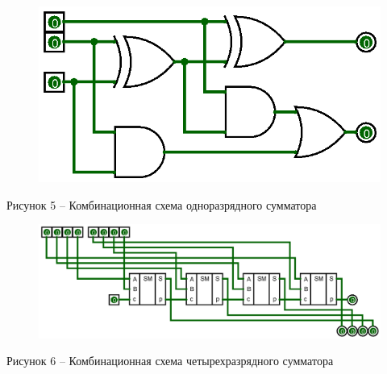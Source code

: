 \documentclass[a4paper,14pt]{extarticle}
\begin{document}
	\begin{figure}[h]
		\centering
		\includegraphics[width=0.5\linewidth]{images/s-2-1}
	\end{figure}
	\begin{center}
		Рисунок 5 – Комбинационная схема одноразрядного сумматора
	\end{center}
	
	\begin{figure}[h]
		\centering
		\includegraphics[width=1\linewidth]{images/s-2-2}
	\end{figure}
	\begin{center}
		Рисунок 6 – Комбинационная схема четырехразрядного сумматора
	\end{center}
	
	\pagebreak
\end{document}
